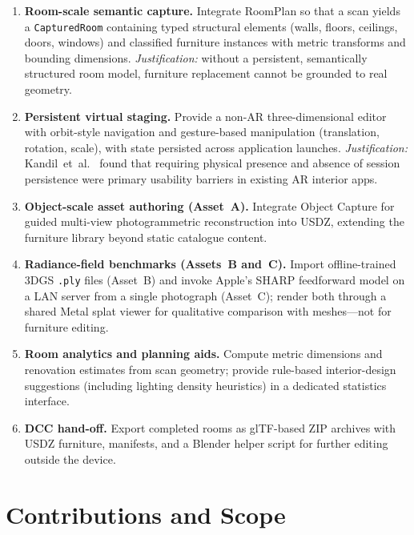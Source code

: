 \begin{enumerate}
  \item \textbf{Room-scale semantic capture.}
    Integrate RoomPlan so that a scan yields a \texttt{CapturedRoom} containing
    typed structural elements (walls, floors, ceilings, doors, windows) and
    classified furniture instances with metric transforms and bounding dimensions.
    \emph{Justification:} without a persistent, semantically structured room
    model, furniture replacement cannot be grounded to real geometry.

  \item \textbf{Persistent virtual staging.}
    Provide a non-AR three-dimensional editor with orbit-style navigation and
    gesture-based manipulation (translation, rotation, scale), with state
    persisted across application launches.
    \emph{Justification:} Kandil~et~al.~\cite{kandil2021ux} found that
    requiring physical presence and absence of session persistence were primary
    usability barriers in existing AR interior apps.

  \item \textbf{Object-scale asset authoring (Asset~A).}
    Integrate Object Capture for guided multi-view photogrammetric
    reconstruction into USDZ, extending the furniture library beyond static
    catalogue content.

  \item \textbf{Radiance-field benchmarks (Assets~B and~C).}
    Import offline-trained 3DGS \texttt{.ply} files (Asset~B) and invoke Apple's
    SHARP feedforward model on a LAN server from a single photograph (Asset~C);
    render both through a shared Metal splat viewer for qualitative comparison
    with meshes---not for furniture editing.

  \item \textbf{Room analytics and planning aids.}
    Compute metric dimensions and renovation estimates from scan geometry;
    provide rule-based interior-design suggestions (including lighting density
    heuristics) in a dedicated statistics interface.

  \item \textbf{DCC hand-off.}
    Export completed rooms as glTF-based ZIP archives with USDZ furniture,
    manifests, and a Blender helper script for further editing outside the device.
\end{enumerate}


\section{Contributions and Scope}
\label{sec:intro:contributions}

